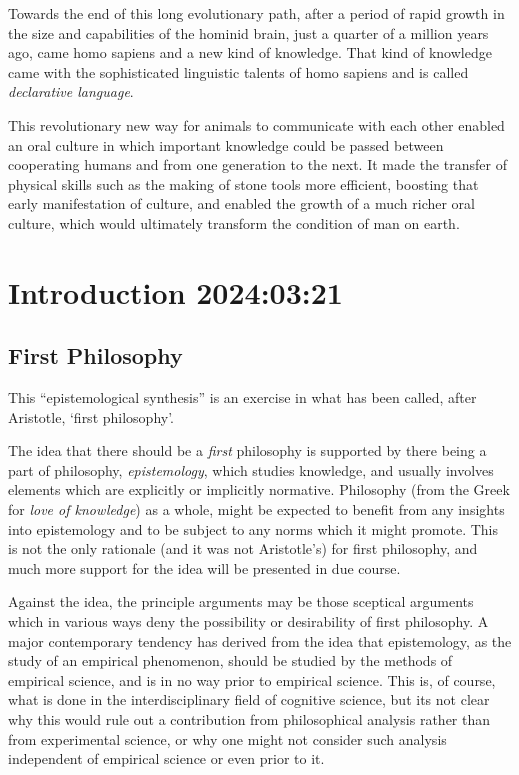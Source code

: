 \documentclass[10pt,titlepage]{book}
\begin{document}
Towards the end of this long evolutionary path, after a period of rapid growth in the size and capabilities of the hominid brain, just a quarter of a million years ago, came homo sapiens and a new kind of knowledge.
That kind of knowledge came with the sophisticated linguistic talents of homo sapiens and is called \emph{declarative language}.

This revolutionary new way for animals to communicate with each other enabled an oral culture in which important knowledge could be passed between cooperating humans and from one generation to the next.
It made the transfer of physical skills such as the making of stone tools more efficient, boosting that early manifestation of culture, and enabled the growth of a much richer oral culture, which would ultimately transform the condition of man on earth.


\chapter{Introduction 2024:03:21}
\section{First Philosophy}
This ``epistemological synthesis'' is an exercise in what has been called, after Aristotle, `first philosophy'.

The idea that there should be a \emph{first} philosophy is supported by there being a part of philosophy, \emph{epistemology}, which studies knowledge, and usually involves elements which are explicitly or implicitly normative.
Philosophy (from the Greek for \emph{love of knowledge}) as a whole, might be expected to benefit from any insights into epistemology and to be subject to any norms which it might promote.
This is not the only rationale (and it was not Aristotle's) for first philosophy, and much more support for the idea will be presented in due course.

Against the idea, the principle arguments may be those sceptical arguments which in various ways deny the possibility or desirability of first philosophy.
A major contemporary tendency has derived from the idea that epistemology, as the study of an empirical phenomenon, should be studied by the methods of empirical science, and is in no way prior to empirical science.
This is, of course, what is done in the interdisciplinary field of cognitive science, but its not clear why this would rule out a contribution from philosophical analysis rather than from experimental science, or why one might not consider such analysis independent of empirical science or even prior to it.
\end{document}
